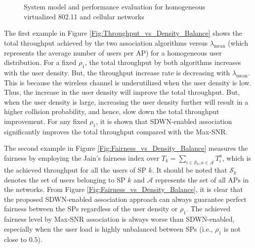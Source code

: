 \documentclass[conference]{IEEEtran}
\begin{document}
\begin{figure*}
	\centering
	\\
	 \\
	\caption{System model and performance evaluation for homogeneous virtualized 802.11 and cellular networks}
	\label{case_study}
	\vspace{10mm}
\end{figure*}


The first example in Figure \ref{Fig:Throughput_vs_Density_Balance} shows the total throughput achieved by the two association algorithms versus $\lambda_{\text{mean}}$ (which represents the average number
of users per AP) for a homogeneous user distribution. For a fixed $\rho_1$, the total throughput by both algorithms increases with the user density. But, the throughput increase rate is decreasing with $\lambda_{\text{mean}}$. This is because the wireless channel is underutilized when the user density is low. Thus, the increase in the user density will improve the total throughput. But, when the user density is large, increasing the user density further will result in a higher collision probability, and hence, slow down the total throughput improvement. For any fixed $\rho_1$, it is shown that SDWN-enabled association significantly improves the total throughput compared with the Max-SNR.

The second example in Figure \ref{Fig:Fairness_vs_Density_Balance} measures the fairness by employing the Jain's fairness index over $T_k=\sum_{i\in \mathcal{S}_k,a\in \mathcal{A}}T_i^a$, which is the achieved throughput for all the users of SP $k$. It should be noted that $\mathcal{S}_k$ denotes the set of users belonging to SP $k$ and $\mathcal{A}$ represents the set of all APs in the networks. From Figure \ref{Fig:Fairness_vs_Density_Balance}, it is clear that the proposed SDWN-enabled association approach can always guarantee perfect fairness between the SPs regardless of the user density or $\rho_1$. The achieved fairness level by Max-SNR association is always worse than SDWN-enabled, especially when the user load is highly unbalanced between SPs (i.e., $\rho_1$ is not close to $0.5$).
\end{document}
